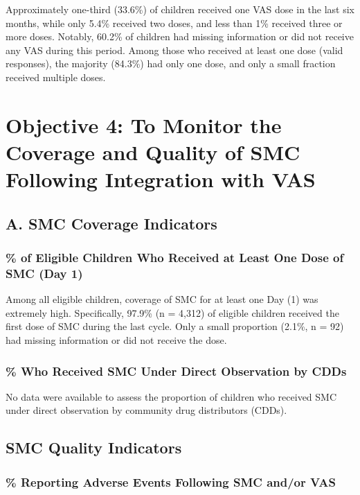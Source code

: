 \documentclass[
  11pt,
]{report}
\begin{document}
Approximately one-third (33.6\%) of children received one VAS dose in
the last six months, while only 5.4\% received two doses, and less than
1\% received three or more doses. Notably, 60.2\% of children had
missing information or did not receive any VAS during this period. Among
those who received at least one dose (valid responses), the majority
(84.3\%) had only one dose, and only a small fraction received multiple
doses.

\chapter{Objective 4: To Monitor the Coverage and Quality of SMC
Following Integration with
VAS}\label{objective-4-to-monitor-the-coverage-and-quality-of-smc-following-integration-with-vas}

\section{A. SMC Coverage Indicators}\label{a.-smc-coverage-indicators}

\subsection{\% of Eligible Children Who Received at Least One Dose of
SMC (Day
1)}\label{of-eligible-children-who-received-at-least-one-dose-of-smc-day-1}

Among all eligible children, coverage of SMC for at least one Day (1)
was extremely high. Specifically, 97.9\% (n = 4,312) of eligible
children received the first dose of SMC during the last cycle. Only a
small proportion (2.1\%, n = 92) had missing information or did not
receive the dose.

\subsection{\% Who Received SMC Under Direct Observation by
CDDs}\label{who-received-smc-under-direct-observation-by-cdds}

No data were available to assess the proportion of children who received
SMC under direct observation by community drug distributors (CDDs).

\section{SMC Quality Indicators}\label{smc-quality-indicators}

\subsection{\% Reporting Adverse Events Following SMC and/or
VAS}\label{reporting-adverse-events-following-smc-andor-vas}
\end{document}
